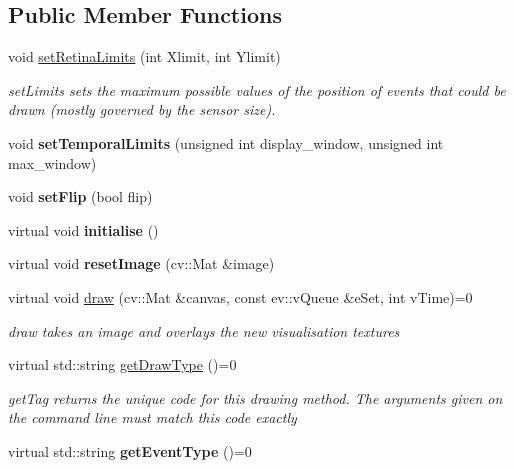 \subsection*{Public Member Functions}
\begin{DoxyCompactItemize}
\item 
void \hyperlink{classev_1_1vDraw_a0362710d8ca805d19b013818660bc867}{set\+Retina\+Limits} (int Xlimit, int Ylimit)
\begin{DoxyCompactList}\small\item\em set\+Limits sets the maximum possible values of the position of events that could be drawn (mostly governed by the sensor size). \end{DoxyCompactList}\item 
\mbox{\label{classev_1_1vDraw_a67241ea174704ad575646713fc045b17}} 
void {\bfseries set\+Temporal\+Limits} (unsigned int display\+\_\+window, unsigned int max\+\_\+window)
\item 
\mbox{\label{classev_1_1vDraw_a82a972ba5dd41bcaaffa2565bd400e89}} 
void {\bfseries set\+Flip} (bool flip)
\item 
\mbox{\label{classev_1_1vDraw_ad4370892e94e8dafcc763addf50bd164}} 
virtual void {\bfseries initialise} ()
\item 
\mbox{\label{classev_1_1vDraw_a98e3b5b7114c777f4e02351b86cc7d75}} 
virtual void {\bfseries reset\+Image} (cv\+::\+Mat \&image)
\item 
virtual void \hyperlink{classev_1_1vDraw_af1eee5dcdf3b4cfee6a3024e5cd706f8}{draw} (cv\+::\+Mat \&canvas, const ev\+::v\+Queue \&e\+Set, int v\+Time)=0
\begin{DoxyCompactList}\small\item\em draw takes an image and overlays the new visualisation textures \end{DoxyCompactList}\item 
virtual std\+::string \hyperlink{classev_1_1vDraw_ac01381befeffef2b930cbceb28b18a28}{get\+Draw\+Type} ()=0
\begin{DoxyCompactList}\small\item\em get\+Tag returns the unique code for this drawing method. The arguments given on the command line must match this code exactly \end{DoxyCompactList}\item 
\mbox{\label{classev_1_1vDraw_a0f9ef3a3f08b34cc0952c16329181d75}} 
virtual std\+::string {\bfseries get\+Event\+Type} ()=0
\end{DoxyCompactItemize}
